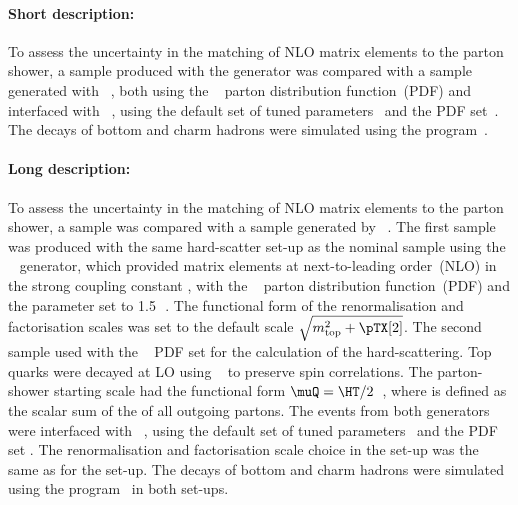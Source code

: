 \paragraph{Short description:}

To assess the uncertainty in the matching of NLO matrix elements to the
parton shower, a sample produced with the
\POWHEGBOX[v2]
generator was compared with a sample generated with \MGNLO[2.6.0]~\cite{Alwall:2014hca}, both using the 
\NNPDF[3.0nlo]~\cite{Ball:2014uwa} parton distribution function~(PDF) and interfaced with
\HERWIG[7.13]~\cite{Bahr:2008pv,Bellm:2015jjp}, using the \HERWIG[7.1] default set of 
tuned parameters~\cite{Bellm:2015jjp} and the \MMHT[lo] PDF set~\cite{Harland-Lang:2014zoa}.
The decays of bottom and charm hadrons
were simulated using the \EVTGEN[1.6.0] program~\cite{Lange:2001uf}. 


\paragraph{Long description:}

To assess the uncertainty in the matching of NLO matrix elements to the parton shower, 
a \POWHEG sample was compared with a sample generated by \MGNLO~\cite{Alwall:2014hca}. 
The first sample was produced with the same hard-scatter set-up as the nominal sample using the 
\POWHEGBOX[v2]~\cite{Frixione:2007nw,Nason:2004rx,Frixione:2007vw,Alioli:2010xd}
generator, which provided matrix elements at next-to-leading
order~(NLO) in the strong coupling constant \alphas, with the
\NNPDF[3.0nlo]~\cite{Ball:2014uwa} parton distribution function~(PDF) and
the \hdamp parameter set to 1.5\,\mtop~\cite{ATL-PHYS-PUB-2016-020}.
The functional form of the renormalisation and factorisation scales was
set to the default scale $\sqrt{\mtop^{2} + \pTX[2]}$.  
The second sample used \MGNLO[2.6.0] with the 
\NNPDF[3.0nlo]~\cite{Ball:2014uwa} PDF set for the calculation of the hard-scattering.
Top quarks were decayed at LO using
\MADSPIN~\cite{Frixione:2007zp,Artoisenet:2012st} to preserve spin
correlations. The parton-shower starting
scale had the functional form $\muQ = \HT/2$~\cite{ATL-PHYS-PUB-2017-007}, 
where \HT is defined
as the scalar sum of the \pT of all outgoing partons.
The events from both generators were interfaced with
\HERWIG[7.13]~\cite{Bahr:2008pv,Bellm:2015jjp}, using the \HERWIG[7.1] default set
of tuned parameters~\cite{Bellm:2015jjp} and the \MMHT[lo] PDF set
\cite{Harland-Lang:2014zoa}.
The renormalisation and factorisation scale choice in the \MGNLO set-up was the same as for the
\POWHEGBOX set-up. The decays of bottom and charm hadrons were simulated
using the \EVTGEN[1.6.0] program~\cite{Lange:2001uf} in both set-ups.


